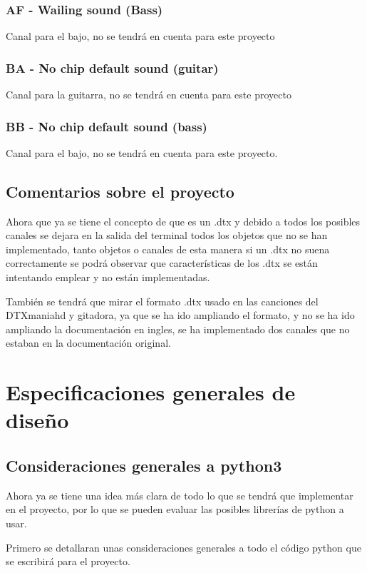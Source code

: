 \documentclass[a4paper,11pt,oneside]{book}
\begin{document}
\subsection{AF - Wailing sound (Bass)}
Canal para el bajo, no se tendrá en cuenta para este proyecto

\subsection{BA - No chip default sound (guitar)}
Canal para la guitarra, no se tendrá en cuenta para este proyecto

\subsection{BB - No chip default sound (bass)}
Canal para el bajo, no se tendrá en cuenta para este proyecto.


\section{Comentarios sobre el proyecto}
Ahora que ya se tiene el concepto de que es  un .dtx y debido a todos los posibles canales se  dejara en la salida del terminal todos los objetos que no se han implementado, tanto objetos o canales de esta manera si un .dtx no suena correctamente se podrá observar que características de los .dtx se están intentando emplear y no están implementadas.

También se tendrá que mirar el formato .dtx usado en las canciones del DTXmaniahd y gitadora, ya que se ha ido ampliando el formato, y no se ha ido ampliando la documentación en ingles, se ha implementado dos canales que no estaban en la documentación original.

\chapter{Especificaciones generales de diseño}
\section{Consideraciones generales a python3}

Ahora ya se tiene una idea más clara de todo lo que se tendrá que implementar en el proyecto, por lo que se pueden evaluar las posibles librerías de python a usar.

Primero se detallaran unas consideraciones generales a todo el código python que se escribirá para el proyecto.
\end{document}
